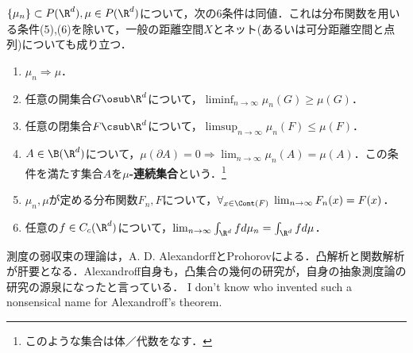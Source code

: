 \documentclass[uplatex,dvipdfmx]{jsreport}
\begin{document}
\begin{theorem}\label{thm-Portmanteau}
    $\{\mu_n\}\subset P(\R^d),\mu\in P(\R^d)$について，次の6条件は同値．これは分布関数を用いる条件(5),(6)を除いて，一般の距離空間$X$とネット(あるいは可分距離空間と点列)についても成り立つ．
    \begin{enumerate}
        \item $\mu_n\Rightarrow\mu$．
        \item 任意の開集合$G\osub\R^d$について，$\liminf_{n\to\infty}\mu_n(G)\ge\mu(G)$．
        \item 任意の閉集合$F\csub\R^d$について，$\limsup_{n\to\infty}\mu_n(F)\le\mu(F)$．
        \item $A\in\B(\R^d)$について，$\mu(\partial A)=0\Rightarrow\lim_{n\to\infty}\mu_n(A)=\mu(A)$．この条件を満たす集合$A$を\textbf{$\mu$-連続集合}という．\footnote{このような集合は体／代数をなす．}
        \item $\mu_n,\mu$が定める分布関数$F_n,F$について，$\forall_{x\in\Cont(F)}\;\lim_{n\to\infty}F_n(x)=F(x)$．
        \item 任意の$f\in C_c(\R^d)$について，$\lim_{n\to\infty}\int_{\R^d}fd\mu_n=\int_{\R^d}fd\mu$．
    \end{enumerate}
\end{theorem}
\begin{history}
    測度の弱収束の理論は，A. D. AlexandorffとProhorovによる．凸解析と関数解析が肝要となる．Alexandroff自身も，凸集合の幾何の研究が，自身の抽象測度論の研究の源泉になったと言っている．
    I don't know who invented such a nonsensical name for Alexandroff's theorem. \cite{Bogachev}
\end{history}
\end{document}
